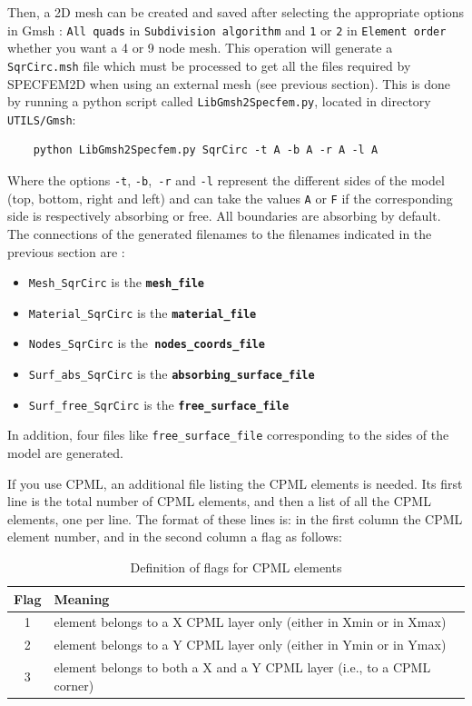 \documentclass[oneside,english,onecolumn,letterpaper]{book}
\begin{document}
Then, a 2D mesh can be created and saved after selecting the appropriate
options in Gmsh : \texttt{All quads} in \texttt{Subdivision algorithm}
and \texttt{1} or \texttt{2} in \texttt{Element order} whether you
want a 4 or 9 node mesh. This operation will generate a \texttt{SqrCirc.msh}
file which must be processed to get all the files required by SPECFEM2D
when using an external mesh (see previous section). This is done by
running a python script called \texttt{LibGmsh2Specfem.py}, located in
directory \texttt{UTILS/Gmsh}:
%
\begin{verbatim}
    python LibGmsh2Specfem.py SqrCirc -t A -b A -r A -l A
\end{verbatim}
%
Where the options \texttt{-t}, \texttt{-b},\texttt{ -r} and \texttt{-l}
represent the different sides of the model (top, bottom, right and
left) and can take the values \texttt{A} or \texttt{F} if the corresponding
side is respectively absorbing or free. All boundaries are absorbing
by default. The connections of the generated filenames to the filenames
indicated in the previous section are :
%
\begin{itemize}
\item \texttt{Mesh\_SqrCirc} is the \texttt{\textbf{mesh\_file}}
\item \texttt{Material\_SqrCirc} is the \texttt{\textbf{material\_file}}
\item \texttt{Nodes\_SqrCirc} is the\texttt{ }\texttt{\textbf{nodes\_coords\_file}}
\item \texttt{Surf\_abs\_SqrCirc} is the \texttt{\textbf{absorbing\_surface\_file}}
\item \texttt{Surf\_free\_SqrCirc} is the \texttt{\textbf{free\_surface\_file}}
\end{itemize}
%
In addition, four files like \texttt{free\_surface\_file} corresponding
to the sides of the model are generated.

If you use CPML, an additional file listing the CPML elements is needed.
Its first line is the total number of
CPML elements, and then a list of all the CPML elements, one per line.
The format of these lines is: in the first column the CPML element number, and in the second column a flag as follows:

\begin{table}[hb]
\caption{Definition of flags for CPML elements}
\centering
\begin{tabular}{c l}
\hline\hline
Flag& Meaning\\ [0.5ex]
\hline
1 & element belongs to a X CPML layer only (either in Xmin or in Xmax)\\
2 & element belongs to a Y CPML layer only (either in Ymin or in Ymax)\\
3 & element belongs to both a X and a Y CPML layer (i.e., to a CPML corner)\\ [1ex]
\hline
\end{tabular}
\label{table:CPMLflags}
\end{table}
\end{document}
